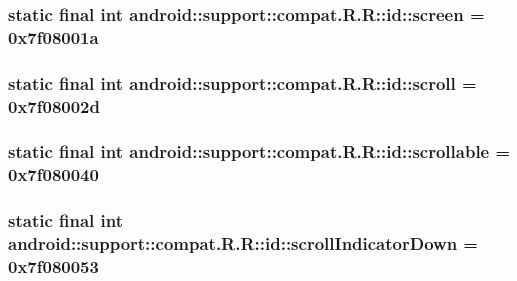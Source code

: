 \hypertarget{classandroid_1_1support_1_1compat_1_1_r_1_1id_4ee3ff6ce72f13d82fe8d856947ec222}{
\subsubsection[{screen}]{\setlength{\rightskip}{0pt plus 5cm}static final int android::support::compat.R.R::id::screen = 0x7f08001a}}
\label{classandroid_1_1support_1_1compat_1_1_r_1_1id_4ee3ff6ce72f13d82fe8d856947ec222}


\hypertarget{classandroid_1_1support_1_1compat_1_1_r_1_1id_a30559ac858a4d4eb2580d31b1e2121e}{
\subsubsection[{scroll}]{\setlength{\rightskip}{0pt plus 5cm}static final int android::support::compat.R.R::id::scroll = 0x7f08002d}}
\label{classandroid_1_1support_1_1compat_1_1_r_1_1id_a30559ac858a4d4eb2580d31b1e2121e}


\hypertarget{classandroid_1_1support_1_1compat_1_1_r_1_1id_7ca0c382f63d137a43405904d9570aa1}{
\subsubsection[{scrollable}]{\setlength{\rightskip}{0pt plus 5cm}static final int android::support::compat.R.R::id::scrollable = 0x7f080040}}
\label{classandroid_1_1support_1_1compat_1_1_r_1_1id_7ca0c382f63d137a43405904d9570aa1}


\hypertarget{classandroid_1_1support_1_1compat_1_1_r_1_1id_7a2e684cd2d9ef8e93e96eeff0f70e07}{
\subsubsection[{scrollIndicatorDown}]{\setlength{\rightskip}{0pt plus 5cm}static final int android::support::compat.R.R::id::scrollIndicatorDown = 0x7f080053}}
\label{classandroid_1_1support_1_1compat_1_1_r_1_1id_7a2e684cd2d9ef8e93e96eeff0f70e07}


